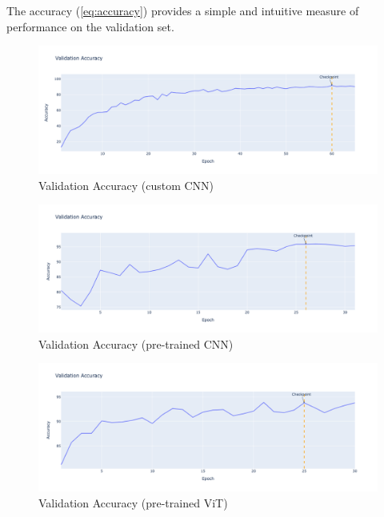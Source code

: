 The accuracy (\ref{eq:accuracy}) provides a simple and intuitive measure of performance on the validation set.

\begin{figure}[htbp]
    \centerline{\includegraphics[width=0.9\linewidth]{../../resources/custom_cnn/accuracy.png}}
    \caption{Validation Accuracy (custom CNN)}
    \label{fig:accuracy-custom-cnn}
\end{figure}

\begin{figure}[htbp]
    \centerline{\includegraphics[width=0.9\linewidth]{../../resources/resnet/accuracy.png}}
    \caption{Validation Accuracy (pre-trained CNN)}
    \label{fig:accuracy-pretrained-cnn}
\end{figure}

\begin{figure}[htbp]
    \centerline{\includegraphics[width=0.9\linewidth]{../../resources/vit/accuracy.png}}
    \caption{Validation Accuracy (pre-trained ViT)}
    \label{fig:accuracy-pretrained-vit}
\end{figure}

